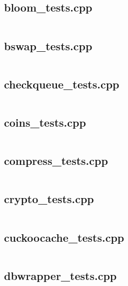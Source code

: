 \documentclass{article}
\begin{document}
\subsection{bloom\_tests.cpp}
\inputminted{cpp}{/home/dufferzafar/dev/@clones/bitcoin/src/test/bloom_tests.cpp}
\newpage

\subsection{bswap\_tests.cpp}
\inputminted{cpp}{/home/dufferzafar/dev/@clones/bitcoin/src/test/bswap_tests.cpp}
\newpage

\subsection{checkqueue\_tests.cpp}
\inputminted{cpp}{/home/dufferzafar/dev/@clones/bitcoin/src/test/checkqueue_tests.cpp}
\newpage

\subsection{coins\_tests.cpp}
\inputminted{cpp}{/home/dufferzafar/dev/@clones/bitcoin/src/test/coins_tests.cpp}
\newpage

\subsection{compress\_tests.cpp}
\inputminted{cpp}{/home/dufferzafar/dev/@clones/bitcoin/src/test/compress_tests.cpp}
\newpage

\subsection{crypto\_tests.cpp}
\inputminted{cpp}{/home/dufferzafar/dev/@clones/bitcoin/src/test/crypto_tests.cpp}
\newpage

\subsection{cuckoocache\_tests.cpp}
\inputminted{cpp}{/home/dufferzafar/dev/@clones/bitcoin/src/test/cuckoocache_tests.cpp}
\newpage

\subsection{dbwrapper\_tests.cpp}
\inputminted{cpp}{/home/dufferzafar/dev/@clones/bitcoin/src/test/dbwrapper_tests.cpp}
\newpage
\end{document}
